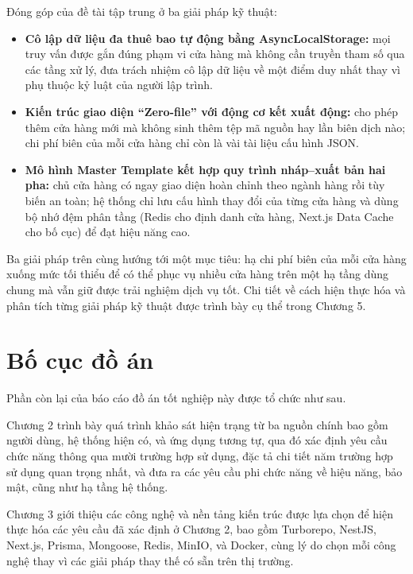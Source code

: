 \documentclass[../main.tex]{subfiles}
\begin{document}
Đóng góp của đề tài tập trung ở ba giải pháp kỹ thuật:

\begin{itemize}
    \item \textbf{Cô lập dữ liệu đa thuê bao tự động bằng AsyncLocalStorage:} mọi truy vấn được gắn đúng phạm vi cửa hàng mà không cần truyền tham số qua các tầng xử lý, đưa trách nhiệm cô lập dữ liệu về một điểm duy nhất thay vì phụ thuộc kỷ luật của người lập trình.
    \item \textbf{Kiến trúc giao diện ``Zero-file'' với động cơ kết xuất động:} cho phép thêm cửa hàng mới mà không sinh thêm tệp mã nguồn hay lần biên dịch nào; chi phí biên của mỗi cửa hàng chỉ còn là vài tài liệu cấu hình JSON.
    \item \textbf{Mô hình Master Template kết hợp quy trình nháp--xuất bản hai pha:} chủ cửa hàng có ngay giao diện hoàn chỉnh theo ngành hàng rồi tùy biến an toàn; hệ thống chỉ lưu cấu hình thay đổi của từng cửa hàng và dùng bộ nhớ đệm phân tầng (Redis cho định danh cửa hàng, Next.js Data Cache cho bố cục) để đạt hiệu năng cao.
\end{itemize}

Ba giải pháp trên cùng hướng tới một mục tiêu: hạ chi phí biên của mỗi cửa hàng xuống mức tối thiểu để có thể phục vụ nhiều cửa hàng trên một hạ tầng dùng chung mà vẫn giữ được trải nghiệm dịch vụ tốt. Chi tiết về cách hiện thực hóa và phân tích từng giải pháp kỹ thuật được trình bày cụ thể trong Chương 5.

\section{Bố cục đồ án}
\label{section:1.4}

Phần còn lại của báo cáo đồ án tốt nghiệp này được tổ chức như sau.

Chương 2 trình bày quá trình khảo sát hiện trạng từ ba nguồn chính bao gồm người dùng, hệ thống hiện có, và ứng dụng tương tự, qua đó xác định yêu cầu chức năng thông qua mười trường hợp sử dụng, đặc tả chi tiết năm trường hợp sử dụng quan trọng nhất, và đưa ra các yêu cầu phi chức năng về hiệu năng, bảo mật, cũng như hạ tầng hệ thống.

Chương 3 giới thiệu các công nghệ và nền tảng kiến trúc được lựa chọn để hiện thực hóa các yêu cầu đã xác định ở Chương 2, bao gồm Turborepo, NestJS, Next.js, Prisma, Mongoose, Redis, MinIO, và Docker, cùng lý do chọn mỗi công nghệ thay vì các giải pháp thay thế có sẵn trên thị trường.
\end{document}
